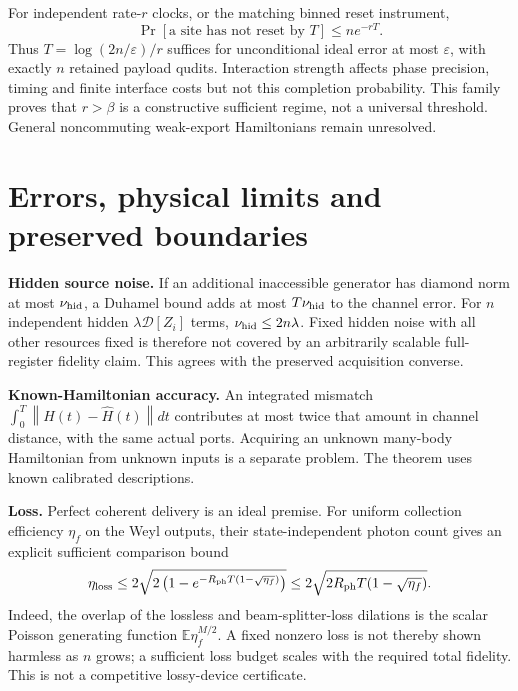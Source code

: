 \documentclass[11pt,a4paper]{article}
\newcommand{\norm}[1]{\left\lVert #1\right\rVert}\newcommand{\ket}[1]{\lvert #1\rangle}\newcommand{\bra}[1]{\langle #1\rvert}
\begin{document}
For independent rate-$r$ clocks, or the matching binned reset instrument,
\begin{equation}
\Pr[\text{a site has not reset by }T]\le n e^{-rT}.
\end{equation}
Thus $T=\log(2n/\varepsilon)/r$ suffices for unconditional ideal error at most $\varepsilon$, with exactly $n$ retained payload qudits. Interaction strength affects phase precision, timing and finite interface costs but not this completion probability. This family proves that $r>\beta$ is a constructive sufficient regime, not a universal threshold. General noncommuting weak-export Hamiltonians remain unresolved.

\section{Errors, physical limits and preserved boundaries}
\label{sec:errors}

\textbf{Hidden source noise.} If an additional inaccessible generator has diamond norm at most $\nu_{\rm hid}$, a Duhamel bound adds at most $T\nu_{\rm hid}$ to the channel error. For $n$ independent hidden $\lambda\mathcal D[Z_i]$ terms, $\nu_{\rm hid}\le2n\lambda$. Fixed hidden noise with all other resources fixed is therefore not covered by an arbitrarily scalable full-register fidelity claim. This agrees with the preserved acquisition converse.

\textbf{Known-Hamiltonian accuracy.} An integrated mismatch $\int_0^T\norm{H(t)-\widehat H(t)}dt$ contributes at most twice that amount in channel distance, with the same actual ports. Acquiring an unknown many-body Hamiltonian from unknown inputs is a separate problem. The theorem uses known calibrated descriptions.

\textbf{Loss.} Perfect coherent delivery is an ideal premise. For uniform collection efficiency $\eta_f$ on the Weyl outputs, their state-independent photon count gives an explicit sufficient comparison bound
\begin{equation}
\eta_{\rm loss}\le
2\sqrt{2\left(1-e^{-R_{\rm ph}T(1-\sqrt{\eta_f})}\right)}
\le2\sqrt{2R_{\rm ph}T(1-\sqrt{\eta_f})}.
\end{equation}
Indeed, the overlap of the lossless and beam-splitter-loss dilations is the scalar Poisson generating function $\mathbb E\eta_f^{M/2}$. A fixed nonzero loss is not thereby shown harmless as $n$ grows; a sufficient loss budget scales with the required total fidelity. This is not a competitive lossy-device certificate.
\end{document}
